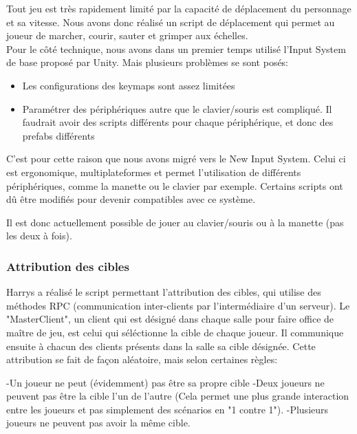             Tout jeu est très rapidement limité par la capacité de déplacement du personnage et sa vitesse.
            Nous avons donc réalisé un script de déplacement qui permet au joueur de marcher, courir, sauter et grimper aux échelles.\\

            Pour le côté technique, nous avons dans un premier temps utilisé l'Input System de base proposé par Unity. Mais plusieurs problèmes se sont posés:
            \begin{itemize}
                \item Les configurations des keymaps sont assez limitées
                \item Paramétrer des périphériques autre que le clavier/souris est compliqué. Il faudrait avoir des scripts différents pour chaque périphérique, et donc des prefabs différents
            \end{itemize}
            C'est pour cette raison que nous avons migré vers le New Input System.
            Celui ci est ergonomique, multiplateformes et permet l'utilisation de différents périphériques, comme la manette ou le clavier par exemple.
            Certains scripts ont dû être modifiés pour devenir compatibles avec ce système.

            Il est donc actuellement possible de jouer au clavier/souris ou à la manette (pas les deux à fois).
            
        \subsubsection{Attribution des cibles}
            
            Harrys a réalisé le script permettant l'attribution des cibles, qui utilise des méthodes RPC (communication inter-clients par l'intermédiaire d'un serveur). Le "MasterClient", un client qui est désigné dans chaque salle pour faire office de maître de jeu, est celui qui séléctionne la cible de chaque joueur. Il communique ensuite à chacun des clients présents dans la salle sa cible désignée. Cette attribution se fait de façon aléatoire, mais selon certaines règles:
                
                -Un joueur ne peut (évidemment) pas être sa propre cible
                -Deux joueurs ne peuvent pas être la cible l'un de l'autre (Cela permet une plus grande interaction entre les joueurs et pas simplement des scénarios en "1 contre 1").
                -Plusieurs joueurs ne peuvent pas avoir la même cible.
                
